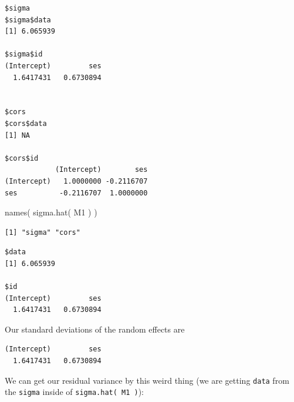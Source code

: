 \documentclass[
  letterpaper,
  DIV=11,
  numbers=noendperiod]{scrreprt}
\newenvironment{Shaded}{\begin{snugshade}}{\end{snugshade}}
\newcommand{\FunctionTok}[1]{\textcolor[rgb]{0.02,0.16,0.49}{#1}}
\newcommand{\NormalTok}[1]{\textcolor[rgb]{0.00,0.44,0.13}{#1}}
\newcommand{\SpecialCharTok}[1]{\textcolor[rgb]{0.25,0.44,0.63}{#1}}
\begin{document}
\begin{verbatim}
$sigma
$sigma$data
[1] 6.065939

$sigma$id
(Intercept)         ses 
  1.6417431   0.6730894 


$cors
$cors$data
[1] NA

$cors$id
            (Intercept)        ses
(Intercept)   1.0000000 -0.2116707
ses          -0.2116707  1.0000000
\end{verbatim}

\begin{Shaded}
\begin{Highlighting}[]
\FunctionTok{names}\NormalTok{( }\FunctionTok{sigma.hat}\NormalTok{( M1 ) )}
\end{Highlighting}
\end{Shaded}

\begin{verbatim}
[1] "sigma" "cors" 
\end{verbatim}

\begin{Shaded}
\end{Shaded}

\begin{verbatim}
$data
[1] 6.065939

$id
(Intercept)         ses 
  1.6417431   0.6730894 
\end{verbatim}

Our standard deviations of the random effects are

\begin{Shaded}
\end{Shaded}

\begin{verbatim}
(Intercept)         ses 
  1.6417431   0.6730894 
\end{verbatim}

We can get our residual variance by this weird thing (we are getting
\texttt{data} from the \texttt{sigma} inside of
\texttt{sigma.hat(\ M1\ )}):

\begin{Shaded}
\end{Shaded}
\end{document}
